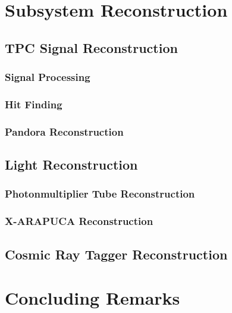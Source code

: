 \section{Subsystem Reconstruction}

\subsection{TPC Signal Reconstruction}
\subsubsection{Signal Processing}
\subsubsection{Hit Finding}
\subsubsection{Pandora Reconstruction}

\subsection{Light Reconstruction}
\subsubsection{Photonmultiplier Tube Reconstruction}
\subsubsection{X-ARAPUCA Reconstruction}

\subsection{Cosmic Ray Tagger Reconstruction}

\section{Concluding Remarks}
